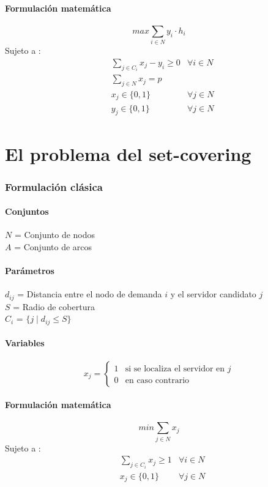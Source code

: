 \documentclass{article}
\numberwithin{equation}{section}
\begin{document}
\subsection{Formulación matemática}
\begin{equation}
max \sum_{i \in N} y_{i} \cdot h_{i}
\end{equation}
Sujeto a : \begin{align}
& \sum_{j \in C_{i}} x_{j} - y_{i} \geq 0 &\forall i \in N \\
& \sum_{j \in N} x_{j} = p\\
& x_{j} \in \{0,1\} &\forall j \in N\\
& y_{j} \in \{0,1\} &\forall j \in N
\end{align}




\newpage
\part{El problema del set-covering}
\section{Formulación clásica}
\subsection{Conjuntos}
$N$ = Conjunto de nodos\\
$A$ = Conjunto de arcos
\subsection{Parámetros}
$d_{ij}$ = Distancia entre el nodo de demanda $i$ y el servidor candidato $j$\\
$S$ = Radio de cobertura\\
$C_{i}$ = $\{j \mid d_{ij} \leq S\}$
\subsection{Variables}
\begin{flushleft}
\[x_{j}={\begin{cases}1&{\mbox{si se localiza el servidor en $j$}}\\0&{\mbox{en caso contrario}}\end{cases}}
\]
\end{flushleft}
\subsection{Formulación matemática}
\begin{equation}
min \sum_{j \in N} x_{j}
\end{equation}
Sujeto a : \begin{align}
& \sum_{j \in C_{i}} x_{j} \geq 1 &\forall i \in N \\
& x_{j} \in \{0,1\} &\forall j \in N
\end{align}
\end{document}
